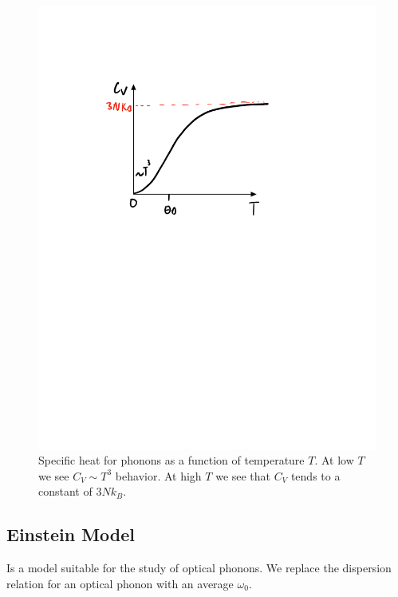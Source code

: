 \begin{figure}[htbp]
    \centering
    \includegraphics[scale=0.7]{Images/fig-phononspecificheat.pdf}

    \caption{Specific heat for phonons as a function of temperature $T$. At low $T$ we see $C_V \sim T^3$ behavior. At high $T$ we see that $C_V$ tends to a constant of $3Nk_B$.}
    \label{fig-phononspecificheat}
\end{figure}

\subsection{Einstein Model}
Is a model suitable for the study of optical phonons. We replace the dispersion relation for an optical phonon with an average $\omega_0$.

